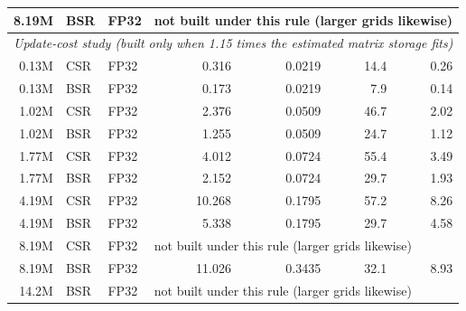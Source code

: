 \begin{tabular}{rllrrrr}
8.19M & BSR & FP32 & \multicolumn{4}{l}{not built under this rule (larger grids likewise)} \\
\midrule
\multicolumn{7}{l}{\emph{Update-cost study (built only when 1.15 times the estimated matrix storage fits)}} \\
0.13M & CSR & FP32 & 0.316 & 0.0219 & 14.4 & 0.26 \\
0.13M & BSR & FP32 & 0.173 & 0.0219 & 7.9 & 0.14 \\
1.02M & CSR & FP32 & 2.376 & 0.0509 & 46.7 & 2.02 \\
1.02M & BSR & FP32 & 1.255 & 0.0509 & 24.7 & 1.12 \\
1.77M & CSR & FP32 & 4.012 & 0.0724 & 55.4 & 3.49 \\
1.77M & BSR & FP32 & 2.152 & 0.0724 & 29.7 & 1.93 \\
4.19M & CSR & FP32 & 10.268 & 0.1795 & 57.2 & 8.26 \\
4.19M & BSR & FP32 & 5.338 & 0.1795 & 29.7 & 4.58 \\
8.19M & CSR & FP32 & \multicolumn{4}{l}{not built under this rule (larger grids likewise)} \\
8.19M & BSR & FP32 & 11.026 & 0.3435 & 32.1 & 8.93 \\
14.2M & BSR & FP32 & \multicolumn{4}{l}{not built under this rule (larger grids likewise)} \\
\bottomrule
\end{tabular}
